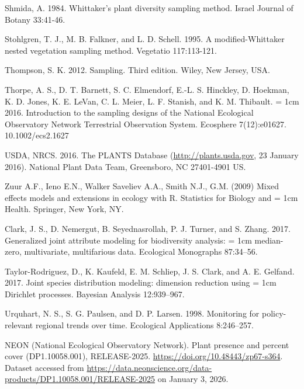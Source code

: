 \documentclass[
  11pt,
]{article}
\begin{document}
Shmida, A. 1984. Whittaker's plant diversity sampling method. Israel
Journal of Botany 33:41-46.

Stohlgren, T. J., M. B. Falkner, and L. D. Schell. 1995. A
modified-Whittaker nested vegetation sampling method. Vegetatio
117:113-121.

Thompson, S. K. 2012. Sampling. Third edition. Wiley, New Jersey, USA.

Thorpe, A. S., D. T. Barnett, S. C. Elmendorf, E.-L. S. Hinckley, D.
Hoekman, K. D. Jones, K. E. LeVan, C. L. Meier, L. F. Stanish, and K. M.
Thibault. \hangindent= 1cm 2016. Introduction to the sampling designs of
the National Ecological Observatory Network Terrestrial Observation
System. Ecosphere 7(12):e01627. 10.1002/ecs2.1627

USDA, NRCS. 2016. The PLANTS Database (\url{http://plants.usda.gov}, 23
January 2016). National Plant Data Team, Greensboro, NC 27401-4901 US.

Zuur A.F., Ieno E.N., Walker Saveliev A.A., Smith N.J., G.M. (2009)
Mixed effects models and extensions in ecology with R. Statistics for
Biology and \hangindent= 1cm Health. Springer, New York, NY.

Clark, J. S., D. Nemergut, B. Seyednasrollah, P. J. Turner, and S.
Zhang. 2017. Generalized joint attribute modeling for biodiversity
analysis: \hangindent= 1cm median-zero, multivariate, multifarious data.
Ecological Monographs 87:34--56.

Taylor-Rodriguez, D., K. Kaufeld, E. M. Schliep, J. S. Clark, and A. E.
Gelfand. 2017. Joint species distribution modeling: dimension reduction
using \hangindent= 1cm Dirichlet processes. Bayesian Analysis
12:939--967.

Urquhart, N. S., S. G. Paulsen, and D. P. Larsen. 1998. Monitoring for
policy-relevant regional trends over time. Ecological Applications
8:246--257.

NEON (National Ecological Observatory Network). Plant presence and
percent cover (DP1.10058.001), RELEASE-2025.
\url{https://doi.org/10.48443/zp67-s364}. Dataset accessed from
\url{https://data.neonscience.org/data-products/DP1.10058.001/RELEASE-2025}
on January 3, 2026.
\end{document}
